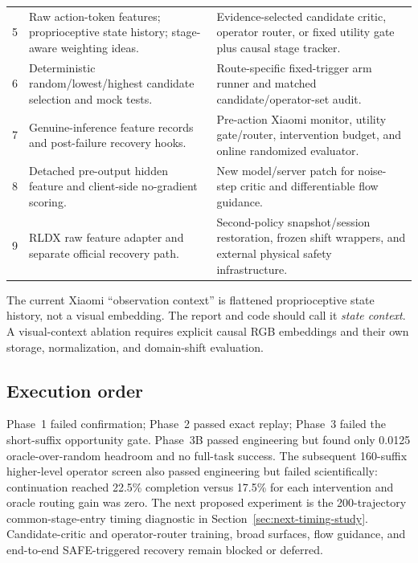 \begin{longtable}{P{0.19\textwidth}P{0.37\textwidth}P{0.36\textwidth}}
5 & Raw action-token features; proprioceptive state history; stage-aware weighting ideas. & Evidence-selected candidate critic, operator router, or fixed utility gate plus causal stage tracker. \\
6 & Deterministic random/lowest/highest candidate selection and mock tests. & Route-specific fixed-trigger arm runner and matched candidate/operator-set audit. \\
7 & Genuine-inference feature records and post-failure recovery hooks. & Pre-action Xiaomi monitor, utility gate/router, intervention budget, and online randomized evaluator. \\
8 & Detached pre-output hidden feature and client-side no-gradient scoring. & New model/server patch for noise-step critic and differentiable flow guidance. \\
9 & RLDX raw feature adapter and separate official recovery path. & Second-policy snapshot/session restoration, frozen shift wrappers, and external physical safety infrastructure. \\
\bottomrule
\end{longtable}

The current Xiaomi ``observation context'' is flattened proprioceptive state history, not a visual embedding. The report and code should call it \emph{state context}. A visual-context ablation requires explicit causal RGB embeddings and their own storage, normalization, and domain-shift evaluation.

\subsection{Execution order}

Phase~1 failed confirmation; Phase~2 passed exact replay; Phase~3 failed the short-suffix opportunity gate. Phase~3B passed engineering but found only 0.0125 oracle-over-random headroom and no full-task success. The subsequent 160-suffix higher-level operator screen also passed engineering but failed scientifically: continuation reached 22.5\% completion versus 17.5\% for each intervention and oracle routing gain was zero. The next proposed experiment is the 200-trajectory common-stage-entry timing diagnostic in Section~\ref{sec:next-timing-study}. Candidate-critic and operator-router training, broad surfaces, flow guidance, and end-to-end SAFE-triggered recovery remain blocked or deferred.

